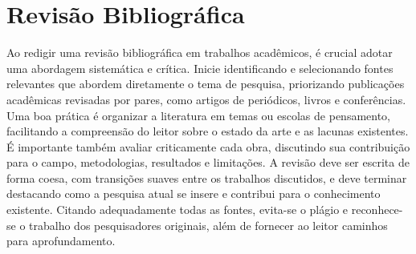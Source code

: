 
\chapter{Revisão Bibliográfica}\label{chap:revisao}

	Ao redigir uma revisão bibliográfica em trabalhos acadêmicos, é crucial adotar uma abordagem sistemática e crítica. Inicie identificando e selecionando fontes relevantes que abordem diretamente o tema de pesquisa, priorizando publicações acadêmicas revisadas por pares, como artigos de periódicos, livros e conferências. Uma boa prática é organizar a literatura em temas ou escolas de pensamento, facilitando a compreensão do leitor sobre o estado da arte e as lacunas existentes. É importante também avaliar criticamente cada obra, discutindo sua contribuição para o campo, metodologias, resultados e limitações. A revisão deve ser escrita de forma coesa, com transições suaves entre os trabalhos discutidos, e deve terminar destacando como a pesquisa atual se insere e contribui para o conhecimento existente. Citando adequadamente todas as fontes, evita-se o plágio e reconhece-se o trabalho dos pesquisadores originais, além de fornecer ao leitor caminhos para aprofundamento.